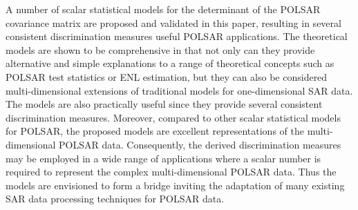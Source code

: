 \documentclass[journal]{IEEEtran}
\begin{document}
A number of scalar statistical models for the determinant of the POLSAR covariance matrix are proposed and validated in this paper,
  resulting in several consistent discrimination measures useful POLSAR applications.
The theoretical models are shown to be comprehensive in that
  not only can they provide alternative and simple explanations to a range of theoretical concepts such as POLSAR test statistics or ENL estimation,
  but they can also be considered multi-dimensional extensions of traditional models for one-dimensional SAR data.
The models are also practically useful since they provide several consistent discrimination measures.
Moreover, compared to other scalar statistical models for POLSAR, the proposed models are excellent representations of the multi-dimensional POLSAR data.
Consequently, the derived discrimination measures may be employed in a wide range of applications where a scalar number is required to represent the complex multi-dimensional POLSAR data.
Thus the models are envisioned to form a bridge inviting the adaptation of many existing SAR data processing techniques for POLSAR data.

%
\end{document}
